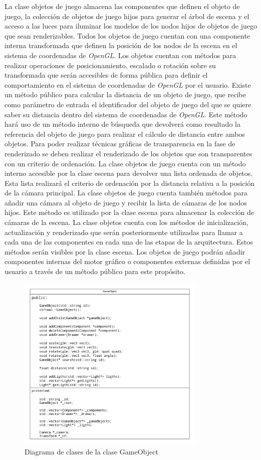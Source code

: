 \documentclass[a4paper]{book}
\begin{document}
La clase objetos de juego almacena las componentes que definen el objeto de juego, la colección de objetos de juego hijos para generar
el árbol de escena y el acceso a las luces para iluminar los modelos de los nodos hijos de objetos de juego que sean renderizables. Todos los
objetos de juego cuentan con una componente interna transformada que definen la posición de los nodos de la escena en el
sistema de coordenadas de \textit{OpenGL}. Los objetos cuentan con métodos para realizar operaciones de posicionamiento, escalado o rotación sobre
su transformada que serán accesibles de forma pública para definir el comportamiento en el sistema de coordenadas de \textit{OpenGL} por
el usuario. Existe un método público para calcular la distancia de un objeto de juego, que recibe como parámetro de entrada el identificador
del objeto de juego del que se quiere saber su distancia dentro del sistema de coordenadas de \textit{OpenGL}. Este método hará uso de
un método interno de búsqueda que devolverá como resultado la referencia del objeto de juego para realizar el cálculo de distancia
entre ambos objetos. Para poder realizar técnicas gráficas de transparencia en la fase de renderizado se deben realizar el renderizado de los
objetos que son transparentes con un criterio de ordenación. La clase objetos de juego cuenta con un método interno accesible por la clase
escena para devolver una lista ordenada de objetos. Esta lista realizará el criterio de ordenación por la distancia relativa a la
posición de la cámara principal. La clase objetos de juego cuenta también métodos para añadir una cámara al objeto de juego y recibir
la lista de cámaras de los nodos hijos. Este método es utilizado por la clase escena para almacenar la colección de cámaras de la escena.
La clase objetos cuenta con los métodos de inicialización, actualización y renderizado que serán posteriormente utilizadas para
llamar a cada una de las componentes en cada una de las etapas de la arquitectura. Estos métodos serán visibles por la clase escena. Los objetos
de juego podrán añadir componentes internas del motor gráfico o componentes externas definidas por el usuario a través de un método público
para este propósito.

\begin{figure}[H]
    \centering
    \includegraphics[width=9cm, keepaspectratio]{img/GameObject.png}
    \caption{Diagrama de clases de la clase GameObject}
    \label{GameObject}
\end{figure}
\end{document}
